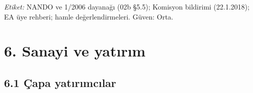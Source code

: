 \endgroup

\emph{Etiket:} \etiketV{} NANDO ve 1/2006 dayanağı (02b §5.5); Komisyon bildirimi (22.1.2018); EA üye rehberi; \etiketH{} hamle değerlendirmeleri. Güven: Orta.

\hypertarget{02c_hazirlik-6-sanayi-ve-yatux131rux131m}{%
\section{6. Sanayi ve yatırım}\label{02c_hazirlik-6-sanayi-ve-yatux131rux131m}}

\hypertarget{02c_hazirlik-61-uxe7apa-yatux131rux131mcux131lar}{%
\subsection{6.1 Çapa yatırımcılar}\label{02c_hazirlik-61-uxe7apa-yatux131rux131mcux131lar}}

